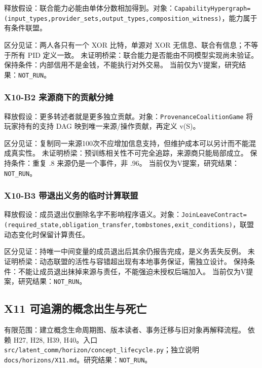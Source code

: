 \documentclass[
  10pt,
]{article}
\begin{document}
释放假设：联合能力必能由单体分数相加得到。对象：\nolinkurl{CapabilityHypergraph=(input_types,provider_sets,output_types,composition_witness)}，能力属于有条件联盟。

区分见证：两人各只有一个 XOR 比特，单源对 XOR
无信息、联合有信息；不等于所有 PID 定义一致。
未证明桥梁：联合能力是否能由不同模型实现尚未验证。
保持条件：内部信用不是金钱，不能执行对外交易。
当前仅为V提案，研究结果：\nolinkurl{NOT_RUN}。

\subsubsection{X10-B2
来源商下的贡献分摊}\label{x10-b2-ux6765ux6e90ux5546ux4e0bux7684ux8d21ux732eux5206ux644a}

释放假设：更多转述者就是更多独立贡献。对象：\nolinkurl{ProvenanceCoalitionGame}
将玩家持有的支持 DAG 映到唯一来源/操作贡献，再定义 v(S)。

区分见证：复制同一来源100次不应增加信息支持，但维护成本可以另计而不能混成真实性。
未证明桥梁：预训练相关性不可完全追踪，来源商只能局部成立。
保持条件：重复 .8 来源仍是一个事件，非 .96。
当前仅为V提案，研究结果：\nolinkurl{NOT_RUN}。

\subsubsection{X10-B3
带退出义务的临时计算联盟}\label{x10-b3-ux5e26ux9000ux51faux4e49ux52a1ux7684ux4e34ux65f6ux8ba1ux7b97ux8054ux76df}

释放假设：成员退出仅删除名字不影响程序语义。对象：\nolinkurl{JoinLeaveContract=(required_state,obligation_transfer,tombstones,exit_conditions)}，联盟动态变化时保留计算责任。

区分见证：持唯一中间变量的成员退出后其余仍报告完成，是义务丢失反例。
未证明桥梁：动态联盟的活性与容错超出现有本地事务保证，需独立设计。
保持条件：不能让成员退出抹掉来源与责任，不能强迫未授权后端加入。
当前仅为V提案，研究结果：\nolinkurl{NOT_RUN}。

\subsection{X11
可追溯的概念出生与死亡}\label{x11-ux53efux8ffdux6eafux7684ux6982ux5ff5ux51faux751fux4e0eux6b7bux4ea1}

有限范围：建立概念生命周期图、版本读者、事务迁移与旧对象再解释流程。
依赖 H27, H28, H39, H40。入口
{\small\nolinkurl{src/latent_comm/horizon/concept_lifecycle.py}}；独立说明
{\small\nolinkurl{docs/horizons/X11.md}}。研究结果：\nolinkurl{NOT_RUN}。
\end{document}
